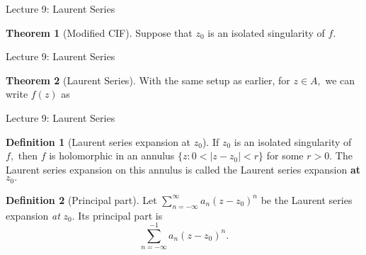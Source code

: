 \documentclass[dvipsnames]{beamer}
\theoremstyle{definition}
\newtheorem{defn}{Definition}
\newtheorem{thm}{Theorem}
\begin{document}
\begin{frame}{Lecture 9: Laurent Series}
    \begin{thm}[Modified CIF]
    Suppose that $z_0$ is an isolated singularity of $f.$  
    \end{thm}
\end{frame}
\begin{frame}{Lecture 9: Laurent Series}
    \begin{thm}[Laurent Series]
        With the same setup as earlier, for $z \in A,$ we can write $f(z)$ as 
    \end{thm}
\end{frame}
\begin{frame}{Lecture 9: Laurent Series}
   \begin{defn}[Laurent series expansion at $z_0$]
        If $z_0$ is an isolated singularity of $f,$ then $f$ is holomorphic in an annulus $\{z : 0 < |z - z_0| < r\}$ for some $r > 0.$ The Laurent series expansion on this annulus is called the Laurent series expansion \textbf{at} $z_0.$ 
   \end{defn}
   \begin{defn}[Principal part]
       Let $\displaystyle\sum_{n = -\infty}^{\infty}a_n(z - z_0)^n$ be the Laurent series expansion \emph{at} $z_0.$ Its principal part is 
       \begin{equation*} 
           \displaystyle\sum_{n = -\infty}^{-1}a_n(z - z_0)^n.
       \end{equation*}
   \end{defn}
\end{frame}
\end{document}
